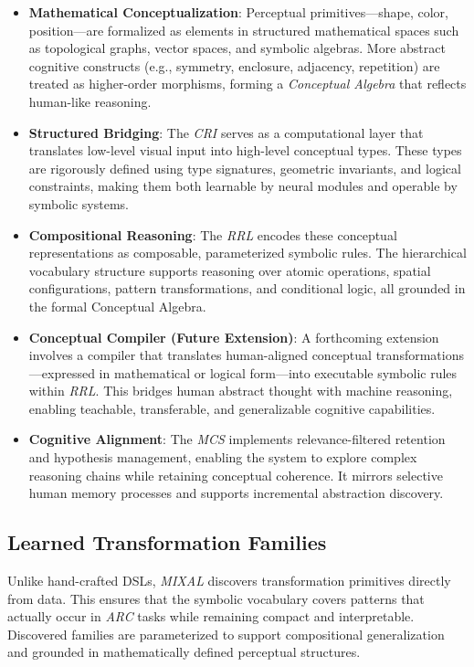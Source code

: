 \documentclass[12pt]{article}
\newcommand{\arc}{\textit{ARC}}
\newcommand{\MIXAL}{\textit{MIXAL}}
\newcommand{\mcs}{\textit{MCS}}
\newcommand{\cri}{\textit{CRI}}
\newcommand{\rrl}{\textit{RRL}}
\begin{document}
\begin{itemize}[noitemsep,topsep=0pt]
\item \textbf{Mathematical Conceptualization}: Perceptual primitives—shape, color, position—are formalized as elements in structured mathematical spaces such as topological graphs, vector spaces, and symbolic algebras. More abstract cognitive constructs (e.g., symmetry, enclosure, adjacency, repetition) are treated as higher-order morphisms, forming a \textit{Conceptual Algebra} that reflects human-like reasoning.

\item \textbf{Structured Bridging}: The \cri{} serves as a computational layer that translates low-level visual input into high-level conceptual types. These types are rigorously defined using type signatures, geometric invariants, and logical constraints, making them both learnable by neural modules and operable by symbolic systems.

\item \textbf{Compositional Reasoning}: The \rrl{} encodes these conceptual representations as composable, parameterized symbolic rules. The hierarchical vocabulary structure supports reasoning over atomic operations, spatial configurations, pattern transformations, and conditional logic, all grounded in the formal Conceptual Algebra.

\item \textbf{Conceptual Compiler (Future Extension)}: A forthcoming extension involves a compiler that translates human-aligned conceptual transformations—expressed in mathematical or logical form—into executable symbolic rules within \rrl{}. This bridges human abstract thought with machine reasoning, enabling teachable, transferable, and generalizable cognitive capabilities.

\item \textbf{Cognitive Alignment}: The \mcs{} implements relevance-filtered retention and hypothesis management, enabling the system to explore complex reasoning chains while retaining conceptual coherence. It mirrors selective human memory processes and supports incremental abstraction discovery.
\end{itemize}

\subsection{Learned Transformation Families}

Unlike hand-crafted DSLs, \MIXAL{} discovers transformation primitives directly from data. This ensures that the symbolic vocabulary covers patterns that actually occur in \arc{} tasks while remaining compact and interpretable. Discovered families are parameterized to support compositional generalization and grounded in mathematically defined perceptual structures.
\end{document}
